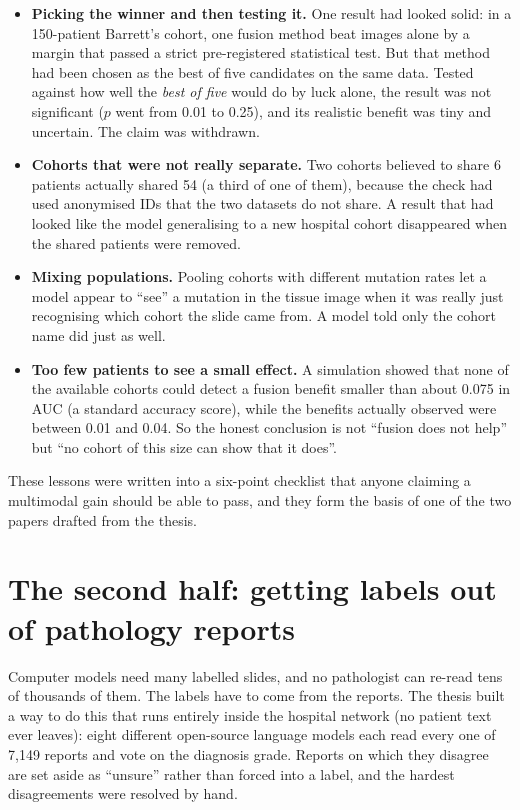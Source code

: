 \documentclass[11pt,a4paper]{article}
\begin{document}
\begin{itemize}
\item \textbf{Picking the winner and then testing it.} One result had looked solid: in a 150-patient Barrett's cohort, one fusion method beat images alone by a margin that passed a strict pre-registered statistical test. But that method had been chosen as the best of five candidates on the same data. Tested against how well the \emph{best of five} would do by luck alone, the result was not significant ($p$ went from 0.01 to 0.25), and its realistic benefit was tiny and uncertain. The claim was withdrawn.
\item \textbf{Cohorts that were not really separate.} Two cohorts believed to share 6 patients actually shared 54 (a third of one of them), because the check had used anonymised IDs that the two datasets do not share. A result that had looked like the model generalising to a new hospital cohort disappeared when the shared patients were removed.
\item \textbf{Mixing populations.} Pooling cohorts with different mutation rates let a model appear to ``see'' a mutation in the tissue image when it was really just recognising which cohort the slide came from. A model told only the cohort name did just as well.
\item \textbf{Too few patients to see a small effect.} A simulation showed that none of the available cohorts could detect a fusion benefit smaller than about 0.075 in AUC (a standard accuracy score), while the benefits actually observed were between 0.01 and 0.04. So the honest conclusion is not ``fusion does not help'' but ``no cohort of this size can show that it does''.
\end{itemize}

These lessons were written into a six-point checklist that anyone claiming a multimodal gain should be able to pass, and they form the basis of one of the two papers drafted from the thesis.

\section*{The second half: getting labels out of pathology reports}
Computer models need many labelled slides, and no pathologist can re-read tens of thousands of them. The labels have to come from the reports. The thesis built a way to do this that runs entirely inside the hospital network (no patient text ever leaves): eight different open-source language models each read every one of 7,149 reports and vote on the diagnosis grade. Reports on which they disagree are set aside as ``unsure'' rather than forced into a label, and the hardest disagreements were resolved by hand.
\end{document}
